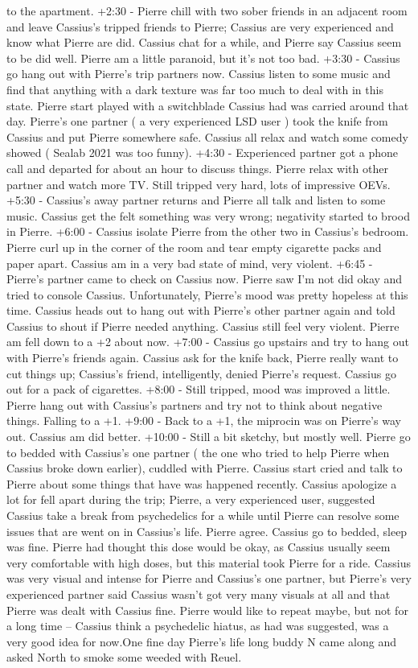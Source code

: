 \documentclass[12pt]{book}
\begin{document}
to the apartment. +2:30 - Pierre chill with two sober friends in an adjacent room and leave Cassius's tripped friends to Pierre; Cassius are very experienced and know what Pierre are did. Cassius chat for a while, and Pierre say Cassius seem to be did well. Pierre am a little paranoid, but it's not too bad. +3:30 - Cassius go hang out with Pierre's trip partners now. Cassius listen to some music and find that anything with a dark texture was far too much to deal with in this state. Pierre start played with a switchblade Cassius had was carried around that day. Pierre's one partner ( a very experienced LSD user ) took the knife from Cassius and put Pierre somewhere safe. Cassius all relax and watch some comedy showed ( Sealab 2021 was too funny). +4:30 - Experienced partner got a phone call and departed for about an hour to discuss things. Pierre relax with other partner and watch more TV. Still tripped very hard, lots of impressive OEVs. +5:30 - Cassius's away partner returns and Pierre all talk and listen to some music. Cassius get the felt something was very wrong; negativity started to brood in Pierre. +6:00 - Cassius isolate Pierre from the other two in Cassius's bedroom. Pierre curl up in the corner of the room and tear empty cigarette packs and paper apart. Cassius am in a very bad state of mind, very violent. +6:45 - Pierre's partner came to check on Cassius now. Pierre saw I'm not did okay and tried to console Cassius. Unfortunately, Pierre's mood was pretty hopeless at this time. Cassius heads out to hang out with Pierre's other partner again and told Cassius to shout if Pierre needed anything. Cassius still feel very violent. Pierre am fell down to a +2 about now. +7:00 - Cassius go upstairs and try to hang out with Pierre's friends again. Cassius ask for the knife back, Pierre really want to cut things up; Cassius's friend, intelligently, denied Pierre's request. Cassius go out for a pack of cigarettes. +8:00 - Still tripped, mood was improved a little. Pierre hang out with Cassius's partners and try not to think about negative things. Falling to a +1. +9:00 - Back to a +1, the miprocin was on Pierre's way out. Cassius am did better. +10:00 - Still a bit sketchy, but mostly well. Pierre go to bedded with Cassius's one partner ( the one who tried to help Pierre when Cassius broke down earlier), cuddled with Pierre. Cassius start cried and talk to Pierre about some things that have was happened recently. Cassius apologize a lot for fell apart during the trip; Pierre, a very experienced user, suggested Cassius take a break from psychedelics for a while until Pierre can resolve some issues that are went on in Cassius's life. Pierre agree. Cassius go to bedded, sleep was fine. Pierre had thought this dose would be okay, as Cassius usually seem very comfortable with high doses, but this material took Pierre for a ride. Cassius was very visual and intense for Pierre and Cassius's one partner, but Pierre's very experienced partner said Cassius wasn't got very many visuals at all and that Pierre was dealt with Cassius fine. Pierre would like to repeat maybe, but not for a long time -- Cassius think a psychedelic hiatus, as had was suggested, was a very good idea for now.One fine day Pierre's life long buddy N came along and asked North to smoke some weeded with Reuel. 
\end{document}
